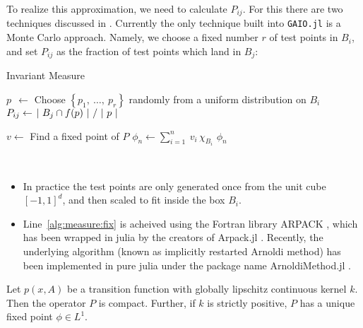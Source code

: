 To realize this approximation, we need to calculate $P_{ij}$. For this there are two 
techniques discussed in \cite*{algGAIO}. Currently the only technique built into 
\texttt{GAIO.jl} is a Monte Carlo approach. Namely, we choose a fixed number $r$ of 
test points in $B_i$, and set $P_{ij}$ as the fraction of test points which land in $B_j$:

\begin{algorithm}
    \caption{Invariant Measure}
    \label{alg:measure}
    \begin{spacing}{1.2}
        \begin{algorithmic}[1]

                \State $p\ \ \gets $ Choose $\left\{ p_1,\ \ldots,\ p_r \right\}$ randomly from a uniform distribution on $B_i$
                \State $P_{ij} \gets \left. |\ B_j \cap f(p)\ | \ \middle/\ |\ p\ | \right.$
            \EndFor
    
            \State $v \gets $ Find a fixed point of $P$
            \label{alg:measure:fix}
            \State $\phi_n \gets \sum_{i=1}^n\: v_i\, \chi_{B_i}$
            \State \Return $\phi_n$
        \end{algorithmic}
    \end{spacing}
\end{algorithm}

\begin{remark}\ 
    \begin{itemize}
        \item In practice the test points are only generated once from the unit cube $[-1,1]^d$, 
        and then scaled to fit inside the box $B_i$.
        \item Line~\ref{alg:measure:fix} is acheived using the Fortran library ARPACK \cite*{ARPACK}, 
        which has been wrapped in julia by the creators of Arpack.jl \cite*{Arpack.jl}. Recently, the 
        underlying algorithm (known as implicitly restarted Arnoldi method) has been 
        implemented in pure julia under the package name ArnoldiMethod.jl \cite*{ArnoldiMethod.jl}. \\
    \end{itemize}
\end{remark}

\begin{proposition}
    \cite*{lasota}
    Let $p(x, A)$ be a transition function with globally lipschitz continuous kernel $k$. 
    Then the operator $P$ is compact. Further, if $k$ is strictly positive, $P$ has
    a unique fixed point $\phi \in L^1$. 
\end{proposition}

